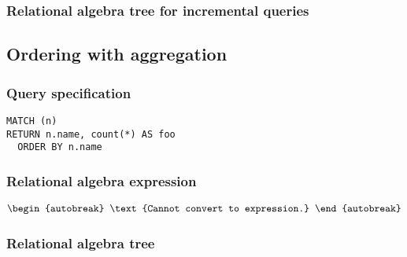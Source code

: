 \subsubsection*{Relational algebra tree for incremental queries}


\subsection{Ordering with aggregation}

\subsubsection*{Query specification}

\begin{lstlisting}
MATCH (n)
RETURN n.name, count(*) AS foo
  ORDER BY n.name
\end{lstlisting}

\subsubsection*{Relational algebra expression}

\begin{align*}
\begin{autobreak}
\text{Cannot convert to expression.}
\end{autobreak}
\end{align*}

\subsubsection*{Relational algebra tree}


